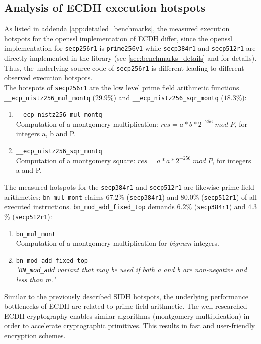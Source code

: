 \subsection{Analysis of \gls{ECDH} execution hotspots}

As listed in addenda \ref{app:detailed_benchmarks}, the measured execution hotspots for the \gls{openssl} implementation of \gls{ECDH} differ, since the \gls{openssl} implementation for \texttt{secp256r1} is \texttt{prime256v1} while \texttt{secp384r1} and \texttt{secp512r1} are directly implemented in the library (see \autoref{sec:benchmarks_details} and \parencite{turner2009elliptic} for details). Thus, the underlying source code of \texttt{secp256r1} is different leading to different observed execution hotspots.\\
The hotspots of \texttt{secp256r1} are the low level prime field arithmetic functions\\\texttt{\_\_ecp\_nistz256\_mul\_montq} ($29.9$\%) and \texttt{\_\_ecp\_nistz256\_sqr\_montq} ($18.3$\%):
\begin{enumerate}
\item \texttt{\_\_ecp\_nistz256\_mul\_montq}\\Computation of a montgomery multiplication: $res = a*b*2^{-256}\;mod\;P$, for integers a, b and P.
\item \texttt{\_\_ecp\_nistz256\_sqr\_montq} \\Computation of a montgomery square: $res = a*a*2^{-256}\;mod\;P$, for integers a and P.
\end{enumerate}
The measured hotspots for the \texttt{secp384r1} and \texttt{secp512r1} are likewise prime field arithmetics: \texttt{bn\_mul\_mont} claims $67.2$\% (\texttt{secp384r1}) and $80.0$\% (\texttt{secp512r1}) of all executed instructions. \texttt{bn\_mod\_add\_fixed\_top} demands $6.2$\% (\texttt{secp384r1}) and $4.3$\% (\texttt{secp512r1}):
\begin{enumerate}
\item \texttt{bn\_mul\_mont}\\Computation of a montgomery multiplication for \textit{bignum} integers.
\item \texttt{bn\_mod\_add\_fixed\_top}\\\textit{"\texttt{BN\_mod\_add} variant that may be used if both a and b are non-negative and less than m."}
\end{enumerate}
Similar to the previously described \gls{SIDH} hotspots, the underlying performance bottlenecks of \gls{ECDH} are related to prime field arithmetic. The well researched \gls{ECDH} cryptography enables similar  algorithms (montgomery multiplication) in order to accelerate cryptographic primitives. This results in fast and user-friendly encryption schemes.

